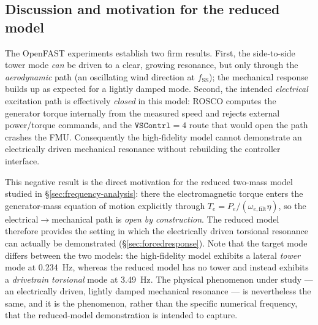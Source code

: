 \subsection{Discussion and motivation for the reduced model}
\label{subsec:of-discussion}

The OpenFAST experiments establish two firm results. First, the side-to-side
tower mode \emph{can} be driven to a clear, growing resonance, but only through
the \emph{aerodynamic} path (an oscillating wind direction at
$f_{\mathrm{SS}}$); the mechanical response builds up as expected for a lightly
damped mode. Second, the intended \emph{electrical} excitation path is
effectively \emph{closed} in this model: ROSCO computes the generator torque
internally from the measured speed and rejects external power/torque commands,
and the $\texttt{VSContrl}=4$ route that would open the path crashes the FMU.
Consequently the high-fidelity model cannot demonstrate an electrically driven
mechanical resonance without rebuilding the controller interface.

This negative result is the direct motivation for the reduced two-mass model
studied in \S\ref{sec:frequency-analysis}: there the electromagnetic torque
enters the generator-mass equation of motion explicitly through
$T_e = P_e/(\omega_{e,\mathrm{filt}}\eta)$, so the electrical$\to$mechanical
path is \emph{open by construction}. The reduced model therefore provides the
setting in which the electrically driven torsional resonance can actually be
demonstrated (\S\ref{sec:forcedresponse}). Note that the target mode differs
between the two models: the high-fidelity model exhibits a lateral \emph{tower}
mode at \SI{0.234}{\hertz}, whereas the reduced model has no tower and instead
exhibits a \emph{drivetrain torsional} mode at \SI{3.49}{\hertz}. The physical
phenomenon under study --- an electrically driven, lightly damped mechanical
resonance --- is nevertheless the same, and it is the phenomenon, rather than
the specific numerical frequency, that the reduced-model demonstration is
intended to capture.
